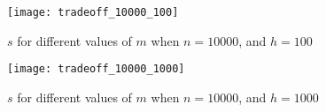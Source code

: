 \documentclass[11pt, a4paper, reqno, twoside]{scrartcl}
\theoremstyle{style}
\newcommand{\wv}{\bm{w}}
\newcommand{\0}{\mathbf{0}} %
\begin{document}
\begin{figure}
\center
\texttt{[image: tradeoff\_10000\_100]} 
\caption{$s$ for different values of $m$ when $n=10000$, and $h = 100$}
\label{fig:tradeoff_10000_100}
\end{figure}
\begin{figure}
\center
\texttt{[image: tradeoff\_10000\_1000]} 
\caption{$s$ for different values of $m$ when $n=10000$, and $h = 1000$}
\label{fig:tradeoff_10000_1000}
\end{figure}

   
% 	
\end{document}
